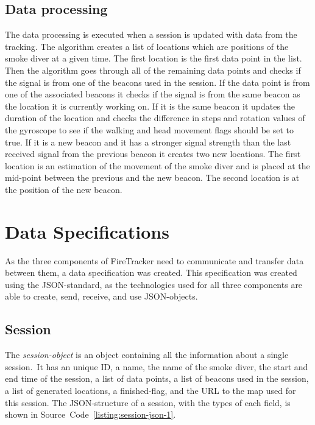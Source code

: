 \documentclass[../Main/thesis.tex]{subfiles}
\begin{document}
\subsection{Data processing}
The data processing is executed when a session is updated with data from the tracking.
The algorithm creates a list of locations which are positions of the smoke diver at a given time.
The first location is the first data point in the list.
Then the algorithm goes through all of the remaining data points and checks if the signal is from one of the beacons used in the session. 
If the data point is from one of the associated beacons it checks if the signal is from the same beacon as the location it is currently working on.
If it is the same beacon it updates the duration of the location and checks the difference in steps and rotation values of the gyroscope to see if the walking and head movement flags should be set to true.
If it is a new beacon and it has a stronger signal strength than the last received signal from the previous beacon it creates two new locations.
The first location is an estimation of the movement of the smoke diver and is placed at the mid-point between the previous and the new beacon.
The second location is at the position of the new beacon.

\section{Data Specifications}
\label{sec:data-specifications-1}
As the three components of FireTracker need to communicate and transfer data between them, a data specification was created.
This specification was created using the JSON-standard, as the technologies used for all three components are able to create, send, receive, and use JSON-objects.

\subsection{Session}
The \textit{session-object} is an object containing all the information about a single session.\
It has an unique ID, a name, the name of the smoke diver, the start and end time of the session, a list of data points, a list of beacons used in the session, a list of generated locations, a finished-flag, and the URL to the map used for this session. 
The JSON-structure of a session, with the types of each field, is shown in Source~Code~\ref{listing:session-json-1}.

\end{document}
